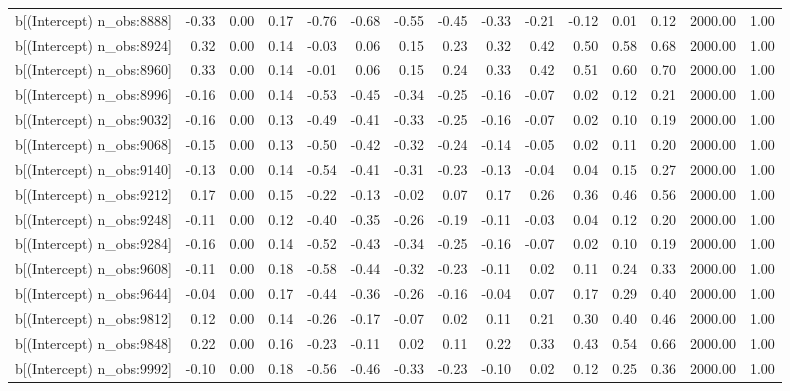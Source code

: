 \begin{table}[ht]
\begin{tabular}{rrrrrrrrrrrrrrr}
  b[(Intercept) n\_obs:8888] & -0.33 & 0.00 & 0.17 & -0.76 & -0.68 & -0.55 & -0.45 & -0.33 & -0.21 & -0.12 & 0.01 & 0.12 & 2000.00 & 1.00 \\ 
  b[(Intercept) n\_obs:8924] & 0.32 & 0.00 & 0.14 & -0.03 & 0.06 & 0.15 & 0.23 & 0.32 & 0.42 & 0.50 & 0.58 & 0.68 & 2000.00 & 1.00 \\ 
  b[(Intercept) n\_obs:8960] & 0.33 & 0.00 & 0.14 & -0.01 & 0.06 & 0.15 & 0.24 & 0.33 & 0.42 & 0.51 & 0.60 & 0.70 & 2000.00 & 1.00 \\ 
  b[(Intercept) n\_obs:8996] & -0.16 & 0.00 & 0.14 & -0.53 & -0.45 & -0.34 & -0.25 & -0.16 & -0.07 & 0.02 & 0.12 & 0.21 & 2000.00 & 1.00 \\ 
  b[(Intercept) n\_obs:9032] & -0.16 & 0.00 & 0.13 & -0.49 & -0.41 & -0.33 & -0.25 & -0.16 & -0.07 & 0.02 & 0.10 & 0.19 & 2000.00 & 1.00 \\ 
  b[(Intercept) n\_obs:9068] & -0.15 & 0.00 & 0.13 & -0.50 & -0.42 & -0.32 & -0.24 & -0.14 & -0.05 & 0.02 & 0.11 & 0.20 & 2000.00 & 1.00 \\ 
  b[(Intercept) n\_obs:9140] & -0.13 & 0.00 & 0.14 & -0.54 & -0.41 & -0.31 & -0.23 & -0.13 & -0.04 & 0.04 & 0.15 & 0.27 & 2000.00 & 1.00 \\ 
  b[(Intercept) n\_obs:9212] & 0.17 & 0.00 & 0.15 & -0.22 & -0.13 & -0.02 & 0.07 & 0.17 & 0.26 & 0.36 & 0.46 & 0.56 & 2000.00 & 1.00 \\ 
  b[(Intercept) n\_obs:9248] & -0.11 & 0.00 & 0.12 & -0.40 & -0.35 & -0.26 & -0.19 & -0.11 & -0.03 & 0.04 & 0.12 & 0.20 & 2000.00 & 1.00 \\ 
  b[(Intercept) n\_obs:9284] & -0.16 & 0.00 & 0.14 & -0.52 & -0.43 & -0.34 & -0.25 & -0.16 & -0.07 & 0.02 & 0.10 & 0.19 & 2000.00 & 1.00 \\ 
  b[(Intercept) n\_obs:9608] & -0.11 & 0.00 & 0.18 & -0.58 & -0.44 & -0.32 & -0.23 & -0.11 & 0.02 & 0.11 & 0.24 & 0.33 & 2000.00 & 1.00 \\ 
  b[(Intercept) n\_obs:9644] & -0.04 & 0.00 & 0.17 & -0.44 & -0.36 & -0.26 & -0.16 & -0.04 & 0.07 & 0.17 & 0.29 & 0.40 & 2000.00 & 1.00 \\ 
  b[(Intercept) n\_obs:9812] & 0.12 & 0.00 & 0.14 & -0.26 & -0.17 & -0.07 & 0.02 & 0.11 & 0.21 & 0.30 & 0.40 & 0.46 & 2000.00 & 1.00 \\ 
  b[(Intercept) n\_obs:9848] & 0.22 & 0.00 & 0.16 & -0.23 & -0.11 & 0.02 & 0.11 & 0.22 & 0.33 & 0.43 & 0.54 & 0.66 & 2000.00 & 1.00 \\ 
  b[(Intercept) n\_obs:9992] & -0.10 & 0.00 & 0.18 & -0.56 & -0.46 & -0.33 & -0.23 & -0.10 & 0.02 & 0.12 & 0.25 & 0.36 & 2000.00 & 1.00 \\ 

\end{tabular}
\end{table}
